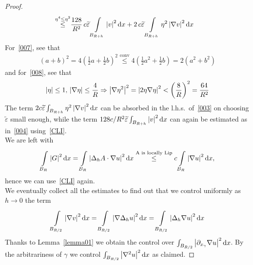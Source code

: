 \begin{proof}
\begin{align}
		\overset{\eta ^{4}\leq \eta ^{2}}{\leq}
		                            & \frac{128}{R^{2}}\, c \widetilde{\varepsilon } \int\limits_{B_{R+h}}^{} \abs{v}^{2} \dd{x} + 2\,c \widetilde{\varepsilon }  \int\limits_{B_{R+h}}^{} \eta ^{2}\abs{\nabla v}^{2} \dd{x}
	\end{align}
	For~\eqref{007}, see that
	\begin{gather}
		{(a+b)}^{2}= 4{\left( \frac{1}{2}a+\frac{1}{2}b \right)} ^{2} \overset{\text{conv}}{\leq } 4 \left( \frac{1}{2}a^{2}+ \frac{1}{2}b \right) = 2(a^{2}+b^{2}) \label{007}
	\end{gather}
	and for~\eqref{008}, see that
	\begin{gather}
		\abs{\eta }\leq 1, \, \abs{\nabla \eta }\leq \frac{4}{R} \Rightarrow \abs{\nabla \eta ^{2}}^{2}=\abs{2 \eta \nabla \eta }^{2} < {\left( \frac{8}{R} \right)} ^{2} = \frac{64}{R^{2}} \label{008}
	\end{gather}
	The term \( 2 c \widetilde{\varepsilon } \int_{B_{R+h}}^{} \eta ^{2} \left\lvert\nabla v\right\rvert^{2} \mathop{}\!\mathrm{d}x \) can be absorbed in the l.h.s.\ of~\eqref{003} on choosing \( \widetilde{\varepsilon } \) small enough, while the term \( \frac{128c}{R^{2}} \widetilde{\varepsilon } \int_{B_{R+h}}^{} \abs{v}^{2} \dd{x} \) can again be estimated as in~\eqref{004} using~\eqref{CLI}. \\
	We are left with
	\begin{gather}
		\int\limits_{B_{R}}^{} \left\lvert G\right\rvert^{2} \mathop{}\!\mathrm{d}x = \int\limits_{B_{R}}^{} \left\lvert\Delta_{h}A \cdot \nabla u\right\rvert^{2} \mathop{}\!\mathrm{d}x \overset{\text{A is locally Lip}}{\leq } c \int\limits_{B_{R}}^{} \left\lvert\nabla u\right\rvert^{2} \mathop{}\!\mathrm{d}x, \label{006}
	\end{gather}
	hence we can use~\eqref{CLI} again. \\
	We eventually collect all the estimates to find out that we control uniformly as \( h \to 0 \) the term
	\begin{gather}
		\int\limits_{B_{\frac{R}{2}}}^{} \abs{\nabla v}^{2} \dd{x}	= \int\limits_{B_{\frac{R}{2}}}^{} \abs{\nabla \Delta _{h}u}^{2} \dd{x}	= \int\limits_{B_{\frac{R}{2}}}^{} \abs{\Delta _{h} \nabla u}^{2} \dd{x}
	\end{gather}
	Thanks to Lemma~\ref{lemma01} we obtain the control over \( \int_{B_{\frac{R}{2}}}^{} \abs{\partial_{x_{\gamma }}	\nabla u}^{2} \dd{x} \). By the arbitrariness of \( \gamma \) we control \( \int_{B_{\frac{R}{2}}}^{} \abs{\nabla ^{2}u}^{2} \dd{x} \) as claimed.
\end{proof}